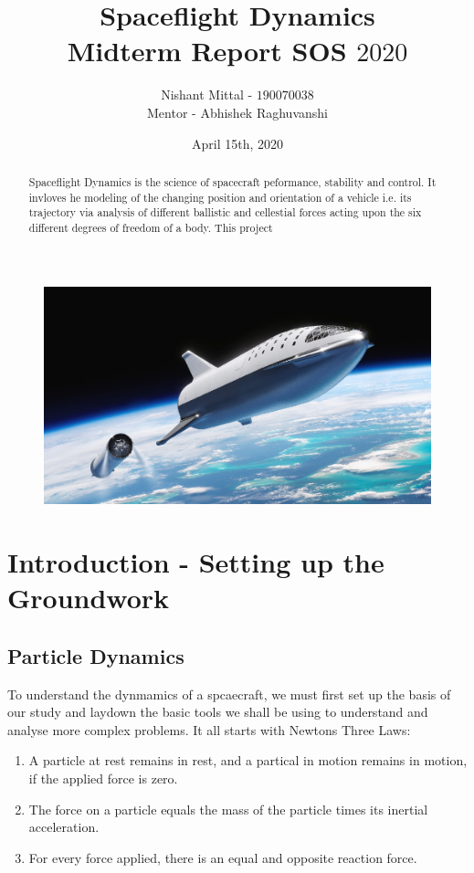 \documentclass[12pt, letterpaper]{article}
\title{\textbf{Spaceflight Dynamics}\\ 
 		\large{Midterm Report SOS $2020$}}
\author{Nishant Mittal - $190070038$\\
Mentor - Abhishek Raghuvanshi}
\date{April 15th, 2020}
\begin{document}
\setlength{\parindent}{0pt}
\maketitle

\begin{figure}[h]
	\centering
    \includegraphics[width=\textwidth]{cover}
\end{figure}

\begin{abstract}
Spaceflight Dynamics is the science of spacecraft peformance, stability and control. It invloves he modeling of the changing position and orientation of a vehicle i.e. its trajectory via analysis of different ballistic and cellestial forces acting upon the six different degrees of freedom of a body. This project 
\end{abstract}

\newpage
\tableofcontents

\newpage
\section{Introduction - Setting up the Groundwork}
\subsection{Particle Dynamics}
To understand the dynmamics of a spcaecraft, we must first set up the basis of our study and laydown the basic tools we shall be using to understand and analyse more complex problems. It all starts with Newtons Three Laws:
\begin{enumerate}

	\item A particle at rest remains in rest, and a partical in motion remains in motion, if the applied force is zero.
	\item The force on a particle equals the mass of the particle times its inertial acceleration.
	\item For every force applied, there is an equal and opposite reaction force.

\end{enumerate}
\end{document}
